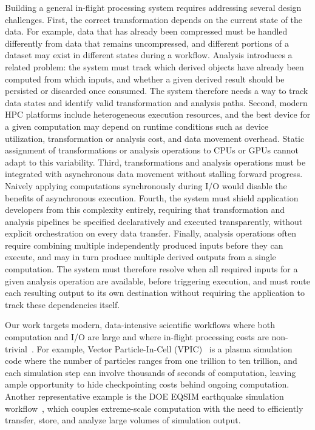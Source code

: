 Building a general in-flight processing system requires addressing several design challenges. First, the correct transformation depends on the current state of the data. For example, data that has already been compressed must be handled differently from data that remains uncompressed, and different portions of a dataset may exist in different states during a workflow. {\color{red}Analysis introduces a related problem: the system must track which derived objects have already been computed from which inputs, and whether a given derived result should be persisted or discarded once consumed.} The system therefore needs a way to track data states and identify valid transformation {\color{red}and analysis} paths. Second, modern HPC platforms include heterogeneous execution resources, and the best device for a given computation may depend on runtime conditions such as device utilization, transformation {\color{red}or analysis} cost, and data movement overhead. Static assignment of transformations {\color{red}or analysis operations} to CPUs or GPUs cannot adapt to this variability. Third, transformations {\color{red}and analysis operations} must be integrated with asynchronous data movement without stalling forward progress. Naively applying computations synchronously during I/O would disable the benefits of asynchronous execution. {\color{red}Fourth}, the system must shield application developers from this complexity entirely, requiring that transformation {\color{red}and analysis} pipelines be specified declaratively and executed transparently, without explicit orchestration on every data transfer. {\color{red}Finally, analysis operations often require combining multiple independently produced inputs before they can execute, and may in turn produce multiple derived outputs from a single computation. The system must therefore resolve when all required inputs for a given analysis operation are available, before triggering execution, and must route each resulting output to its own destination without requiring the application to track these dependencies itself.}

Our work targets modern, data-intensive scientific workflows where both computation and I/O are large and where in-flight processing costs are non-trivial~\cite{ecp2019eqsim, mccallen2021eqsim, mccallen2024regional, patwary2015bdcats, tan2022analysis}. For example, Vector Particle-In-Cell (VPIC)~\cite{tan2022analysis} is a plasma simulation code where the number of particles ranges from one trillion to ten trillion, and each simulation step can involve thousands of seconds of computation, leaving ample opportunity to hide checkpointing costs behind ongoing computation. Another representative example is the DOE EQSIM earthquake simulation workflow~\cite{ecp2019eqsim, mccallen2021eqsim, mccallen2024regional}, which couples extreme-scale computation with the need to efficiently transfer, store, and analyze large volumes of simulation output.

